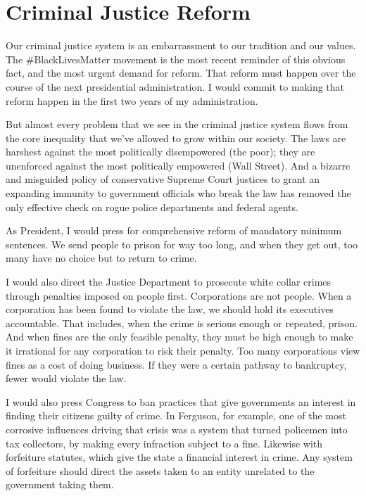 \section{Criminal Justice Reform}
\label{sec:crim-just-reform}

Our criminal justice system is an embarrassment to our tradition and our values. The \#BlackLivesMatter movement is the most recent reminder of this obvious fact, and the most urgent demand for reform. That reform must happen over the course of the next presidential administration. I would commit to making that reform happen in the first two years of my administration.

But almost every problem that we see in the criminal justice system flows from the core inequality that we've allowed to grow within our society. The laws are harshest against the most politically disempowered (the poor); they are unenforced against the most politically empowered (Wall Street). And a bizarre and misguided policy of conservative Supreme Court justices to grant an expanding immunity to government officials who break the law has removed the only effective check on rogue police departments and federal agents.

As President, I would press for comprehensive reform of mandatory minimum sentences. We send people to prison for way too long, and when they get out, too many have no choice but to return to crime.

I would also direct the Justice Department to prosecute white collar crimes through penalties imposed on people first. Corporations are not people. When a corporation has been found to violate the law, we should hold its executives accountable. That includes, when the crime is serious enough or repeated, prison. And when fines are the only feasible penalty, they must be high enough to make it irrational for any corporation to risk their penalty. Too many corporations view fines as a cost of doing business. If they were a certain pathway to bankruptcy, fewer would violate the law.

I would also press Congress to ban practices that give governments an interest in finding their citizens guilty of crime. In Ferguson, for example, one of the most corrosive influences driving that crisis was a system that turned policemen into tax collectors, by making every infraction subject to a fine. Likewise with forfeiture statutes, which give the state a financial interest in crime. Any system of forfeiture should direct the assets taken to an entity unrelated to the government taking them.

